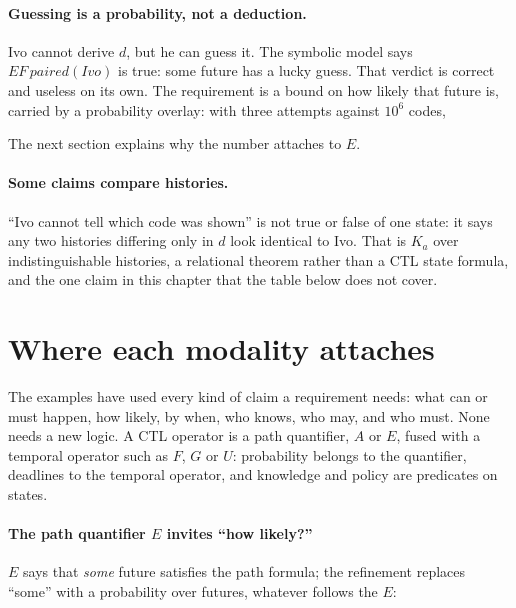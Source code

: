 \paragraph{Guessing is a probability, not a deduction.} Ivo cannot derive $d$,
but he can guess it. The symbolic model says $EF\,\mathit{paired}(\mathit{Ivo})$
is true: some future has a lucky guess. That verdict is correct and useless on
its own. The requirement is a bound on how likely that future is, carried by a
probability overlay: with three attempts against $10^6$ codes,


The next section explains why the number attaches to $E$.

\paragraph{Some claims compare histories.} ``Ivo cannot tell which code was
shown'' is not true or false of one state: it says any two histories differing
only in $d$ look identical to Ivo. That is $K_a$ over indistinguishable
histories, a relational theorem rather than a CTL state formula, and the one
claim in this chapter that the table below does not cover.

\section{Where each modality attaches}

The examples have used every kind of claim a requirement needs: what can or must
happen, how likely, by when, who knows, who may, and who must. None needs a new
logic. A CTL operator is a path quantifier, $A$ or $E$, fused with a temporal
operator such as $F$, $G$ or $U$: probability belongs to the quantifier, deadlines
to the temporal operator, and knowledge and policy are predicates on states.

\paragraph{The path quantifier $E$ invites ``how likely?''} $E$ says that
\emph{some} future satisfies the path formula; the refinement replaces ``some''
with a probability over futures, whatever follows the $E$:


